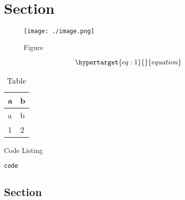 \hypertarget{section}{%
\section{Section}\label{section}}

\begin{figure}
\hypertarget{fig:1}{%
\centering
\texttt{[image: ./image.png]}
\caption{Figure}\label{fig:1}
}
\end{figure}

\begin{equation}\protect\hypertarget{eq:1}{}{equation}\label{eq:1}\end{equation}

\hypertarget{tbl:1}{}
\begin{longtable}[]{@{}ll@{}}
\caption{\label{tbl:1}Table}\tabularnewline
\toprule
a & b \\
\midrule
\endfirsthead
\toprule
a & b \\
\midrule
\endhead
1 & 2 \\
\bottomrule
\end{longtable}

\begin{codelisting}

\caption{Code Listing}

\hypertarget{lst:1}{%
\label{lst:1}}%
\begin{verbatim}
code
\end{verbatim}

\end{codelisting}

\hypertarget{section-1}{%
\subsection{Section}\label{section-1}}
